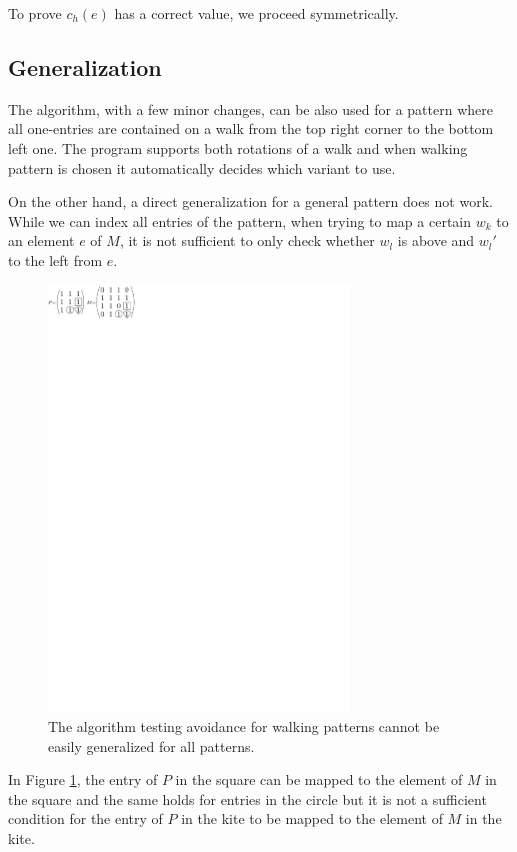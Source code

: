 To prove $c_h(e)$ has a correct value, we proceed symmetrically.

\subsection{Generalization}
The algorithm, with a few minor changes, can be also used for a pattern where all one-entries are contained on a walk from the top right corner to the bottom left one. The program supports both rotations of a walk and when walking pattern is chosen it automatically decides which variant to use.

On the other hand, a direct generalization for a general pattern does not work. While we can index all entries of the pattern, when trying to map a certain $w_k$ to an element $e$ of $M$, it is not sufficient to only check whether $w_l$ is above and $w_l'$ to the left from $e$.
\begin{figure}[h!]
\centering
\includegraphics[width=80mm]{../img/nogeneral.pdf}
\caption{The algorithm testing avoidance for walking patterns cannot be easily generalized for all patterns.}
\label{nogeneral}
\end{figure}

In Figure \ref{nogeneral}, the entry of $P$ in the square can be mapped to the element of $M$ in the square and the same holds for entries in the circle but it is not a sufficient condition for the entry of $P$ in the kite to be mapped to the element of $M$ in the kite.